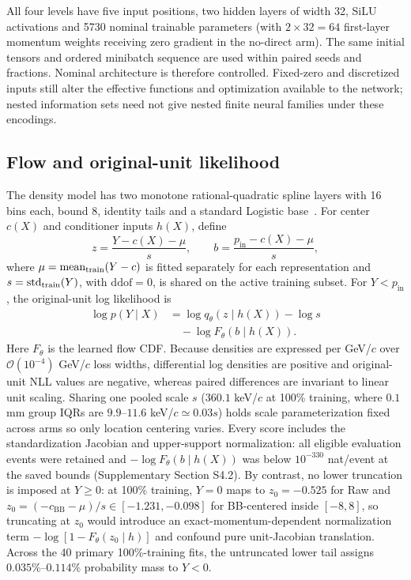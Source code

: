 \documentclass[twocolumn,epjc3]{svjour3}
\newcommand{\pin}{p_{\mathrm{in}}}
\begin{document}
All four levels have five input positions, two hidden layers of width 32,
SiLU activations and 5730 nominal trainable parameters (with $2\times32=64$
first-layer momentum weights receiving zero gradient in the no-direct arm).
The same initial tensors and ordered minibatch sequence are used within paired
seeds and fractions. Nominal architecture is therefore controlled. Fixed-zero
and discretized inputs still alter the effective functions and optimization
available to the network; nested information sets need not give nested finite
neural families under these encodings.

\subsection{Flow and original-unit likelihood}

The density model has two monotone rational-quadratic spline layers with
16 bins each, bound 8, identity tails and a standard Logistic
base~\cite{DurkanEtAl2019}. For center $c(X)$ and conditioner inputs $h(X)$,
define
\begin{equation}
 z=\frac{Y-c(X)-\mu}{s},\qquad b=\frac{\pin-c(X)-\mu}{s},
\end{equation}
where $\mu=\operatorname{mean}_{\rm train}(Y-c)$ is fitted separately for
each representation and $s=\operatorname{std}_{\rm train}(Y)$, with
$\mathrm{ddof}=0$, is shared on the active training subset. For $Y<\pin$, the
original-unit log likelihood is
\begin{equation}
 \begin{aligned}
  \log p(Y\mid X) &= \log q_\theta(z\mid h(X))-\log s \\
  &\quad -\log F_\theta(b\mid h(X)).
 \end{aligned}
 \label{eq:likelihood}
\end{equation}
Here $F_\theta$ is the learned flow CDF. Because densities are expressed per
GeV/$c$ over $\mathcal{O}(10^{-4})$ GeV/$c$ loss widths, differential log
densities are positive and original-unit NLL values are negative, whereas
paired differences are invariant to linear unit scaling. Sharing one pooled
scale $s$ ($360.1$ keV/$c$ at 100\% training, where $0.1$ mm group IQRs are
$9.9$--$11.6$ keV/$c\simeq0.03s$) holds scale parameterization fixed across
arms so only location centering varies. Every score includes the
standardization Jacobian and upper-support normalization: all eligible
evaluation events were retained and $-\log F_\theta(b\mid h(X))$ was below
$10^{-330}$ nat/event at the saved bounds (Supplementary Section S4.2). By
contrast, no lower truncation is imposed at $Y\geq0$: at 100\% training,
$Y=0$ maps to $z_0=-0.525$ for Raw and $z_0=(-c_{\mathrm{BB}}-\mu)/s\in[-1.231,-0.098]$
for BB-centered inside $[-8,8]$, so truncating at $z_0$ would introduce an
exact-momentum-dependent normalization term $-\log[1-F_\theta(z_0\mid h)]$ and
confound pure unit-Jacobian translation. Across the 40 primary 100\%-training
fits, the untruncated lower tail assigns $0.035\%$--$0.114\%$ probability mass
to $Y<0$.
\end{document}
